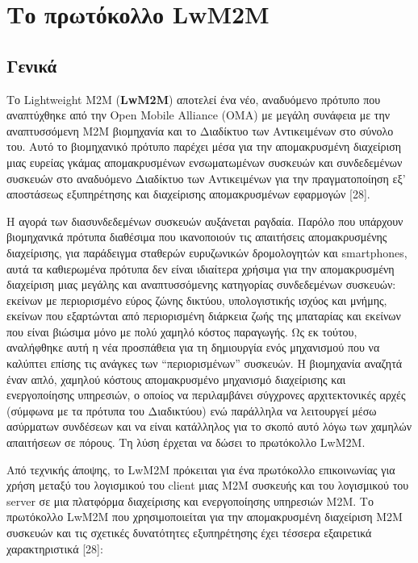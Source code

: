 \chapter{Το πρωτόκολλο LwM2M } %

\label{Chapter3} 



\section{Γενικά}
Το Lightweight M2M (\textbf{LwM2M}) αποτελεί ένα νέο, αναδυόμενο πρότυπο που αναπτύχθηκε από την Open Mobile Alliance (OMA) με μεγάλη συνάφεια με την αναπτυσσόμενη M2M βιομηχανία και το Διαδίκτυο των Αντικειμένων στο σύνολο του. Αυτό το βιομηχανικό πρότυπο παρέχει μέσα για την απομακρυσμένη διαχείριση μιας ευρείας γκάμας απομακρυσμένων ενσωματωμένων συσκευών και συνδεδεμένων συσκευών στο αναδυόμενο Διαδίκτυο των Αντικειμένων για την πραγματοποίηση εξ’ αποστάσεως εξυπηρέτησης και διαχείρισης απομακρυσμένων εφαρμογών [28].  

Η αγορά των διασυνδεδεμένων συσκευών αυξάνεται ρα­γδαία. Παρόλο που υπάρχουν βιομηχανικά πρότυπα διαθέσιμα που ικανοποιούν τις απαιτήσεις απομακρυσμένης διαχείρισης, για παράδειγμα σταθερών ευρυζωνικών δρομολογητών και smartphones, αυτά τα καθιερωμένα πρότυπα δεν είναι ιδιαίτερα χρήσιμα για την απομακρυσμένη διαχείριση μιας μεγάλης και ανα­πτυσσόμενης κατηγορίας συνδεδεμένων συσκευών: εκείνων με περιορισμένο εύρος ζώνης δικτύου, υπολογιστικής ισχύος και μνήμης, εκείνων που εξαρτώνται από περιορισμένη διάρκεια ζωής της μπαταρίας και εκείνων που είναι βιώσιμα μόνο με πολύ χαμη­λό κόστος παραγωγής. Ως εκ τούτου, αναλήφθηκε αυτή η νέα προ­σπάθεια για τη δημιουργία ενός μηχανισμού που να καλύπτει επίσης τις ανάγκες των “περιορισμένων” συσκευών. Η βιομηχα­νία αναζητά έναν απλό, χαμηλού κόστους απομακρυσμένο μηχανι­σμό διαχείρισης και ενεργοποίησης υπηρεσιών, ο οποίος να περιλαμβάνει σύγχρονες αρχιτεκτονικές αρχές (σύμφωνα με τα πρότυ­πα του Διαδικτύου) ενώ παράλληλα να λειτουργεί μέσω ασύρμα­των συνδέσεων και να είναι κατάλληλος για το σκοπό αυτό λόγω των χαμηλών απαιτήσεων σε πόρους. Τη λύση έρχεται να δώσει το πρωτόκολλο LwM2M.

Από τεχνικής άποψης, το LwM2M πρόκειται για ένα πρωτόκολλο επικοινωνίας για χρήση μεταξύ του λογισμικού του client μιας M2M συσκευής και του λογισμικού του server σε μια πλατφόρμα διαχείρισης και ενεργοποίησης υπηρεσιών Μ2Μ. Το πρωτόκολλο LwM2M που χρησιμοποιείται για την απομακρυσμένη διαχείριση Μ2Μ συσκευών και τις σχετικές δυνατότητες εξυπηρέτησης έχει τέσσερα εξαιρετικά χαρακτηριστικά [28]:

